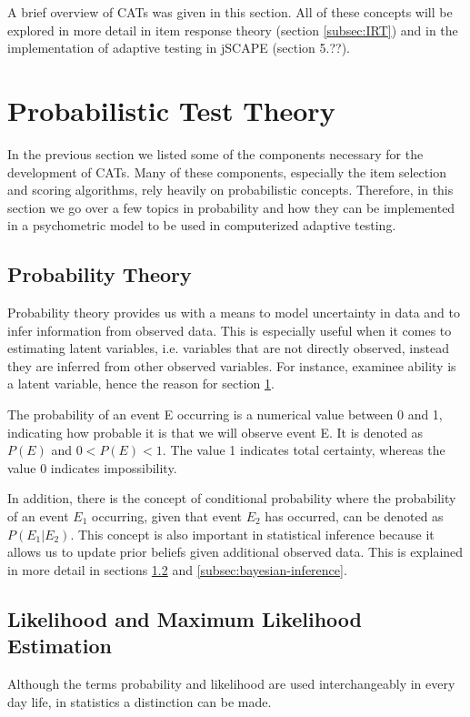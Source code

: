 A brief overview of CATs was given in this section. All of these concepts will be explored in more detail in item response theory (section \ref{subsec:IRT}) and in the implementation of adaptive testing in jSCAPE (section 5.??).

\section{Probabilistic Test Theory}
\label{sec:probabilistic-test-theory}
In the previous section we listed some of the components necessary for the development of CATs. Many of these components, especially the item selection and scoring algorithms, rely heavily on probabilistic concepts. Therefore, in this section we go over a few topics in probability and how they can be implemented in a psychometric model to be used in computerized adaptive testing.

\subsection{Probability Theory}
Probability theory provides us with a means to model uncertainty in data and to infer information from observed data. This is especially useful when it comes to estimating latent variables, i.e. variables that are not directly observed, instead they are inferred from other observed variables. For instance, examinee ability is a latent variable, hence the reason for section \ref{sec:probabilistic-test-theory}.
\newline

The probability of an event E occurring is a numerical value between 0 and 1, indicating how probable it is that we will observe event E. It is denoted as $P(E)$ and $0 < P(E) < 1$. The value 1 indicates total certainty, whereas the value 0 indicates impossibility. \newline

In addition, there is the concept of conditional probability where the probability of an event $E_1$ occurring, given that event $E_2$ has occurred, can be denoted as $P(E_1|E_2)$. This concept is also important in statistical inference because it allows us to update prior beliefs given additional observed data. This is explained in more detail in sections \ref{subsec:likelihood-and-mle} and \ref{subsec:bayesian-inference}.

\subsection{Likelihood and Maximum Likelihood Estimation}
\label{subsec:likelihood-and-mle}
Although the terms probability and likelihood are used interchangeably in every day life, in statistics a distinction can be made.\newline

